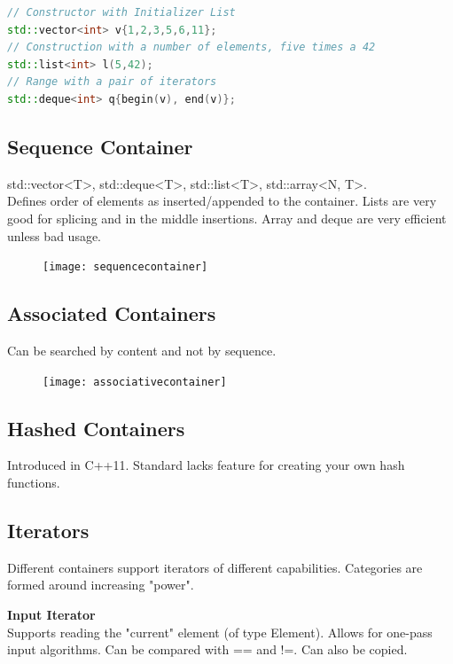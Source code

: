 \begin{lstlisting}[language=C++]
// Constructor with Initializer List
std::vector<int> v{1,2,3,5,6,11};
// Construction with a number of elements, five times a 42
std::list<int> l(5,42);
// Range with a pair of iterators
std::deque<int> q{begin(v), end(v)};
\end{lstlisting}

\subsection{Sequence Container}
std::vector<T>, std::deque<T>, std::list<T>, std::array<N, T>.\\
Defines order of elements as inserted/appended to the container. Lists are very good for splicing and in the middle insertions. Array and deque are very efficient unless bad usage.

\begin{figure}[h!]
 	\centering
 	\texttt{[image: sequencecontainer]}
  \caption{}
\end{figure}


\subsection{Associated Containers}
Can be searched by content and not by sequence. 

\begin{figure}[h!]
  \centering
  \texttt{[image: associativecontainer]}
  \caption{}
\end{figure}


\subsection{Hashed Containers}
Introduced in C++11. Standard lacks feature for creating your own hash functions. 

\subsection{Iterators}
Different containers support iterators of different capabilities. Categories are formed around increasing "power".

\textbf{Input Iterator} \\
Supports reading the "current" element (of type Element). Allows for one-pass input algorithms.  Can be compared with == and !=. Can also be copied.

